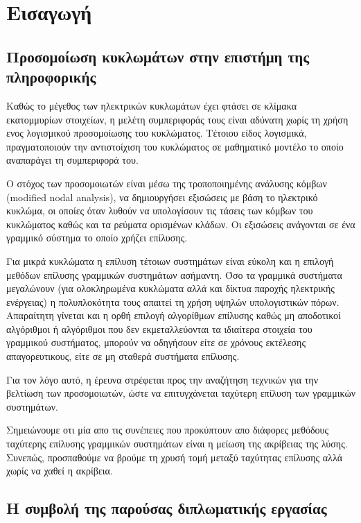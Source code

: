 \chapter{Εισαγωγή}
\label{ch:1.chapterIntroduction}

\section{Προσομοίωση κυκλωμάτων στην επιστήμη της πληροφορικής}

Καθώς το μέγεθος των ηλεκτρικών κυκλωμάτων έχει φτάσει σε κλίμακα εκατομμυρίων στοιχείων, η μελέτη συμπεριφοράς τους είναι αδύνατη χωρίς τη χρήση ενος λογισμικού προσομοίωσης του κυκλώματος. Τέτοιου είδος λογισμικά, πραγματοποιούν την αντιστοίχιση του κυκλώματος σε μαθηματικό μοντέλο το οποίο αναπαράγει τη συμπεριφορά του.

Ο στόχος των προσομοιωτών είναι μέσω της τροποποιημένης ανάλυσης κόμβων (modified nodal analysis), να δημιουργήσει εξισώσεις με βάση το ηλεκτρικό κυκλώμα, οι οποίες όταν λυθούν να υπολογίσουν τις τάσεις των κόμβων του κυκλώματος καθώς και τα ρεύματα ορισμένων κλάδων. Οι εξισώσεις ανάγονται σε ένα γραμμικό σύστημα το οποίο χρήζει επίλυσης. 

Για μικρά κυκλώματα η επίλυση τέτοιων συστημάτων είναι εύκολη και η επιλογή μεθόδων επίλυσης γραμμικών συστημάτων ασήμαντη. Όσο τα γραμμικά συστήματα μεγαλώνουν (για ολοκληρωμένα κυκλώματα αλλά και δίκτυα παροχής ηλεκτρικής ενέργειας) η πολυπλοκότητα τους απαιτεί τη χρήση υψηλών υπολογιστικών πόρων. Απαραίτητη γίνεται και η ορθή επιλογή αλγορίθμων επίλυσης καθώς μη αποδοτικοί αλγόριθμοι ή αλγόριθμοι που δεν εκμεταλλεύονται τα ιδιαίτερα στοιχεία του γραμμικού συστήματος, μπορούν να οδηγήσουν είτε σε χρόνους εκτέλεσης απαγορευτικους, είτε σε μη σταθερά συστήματα επίλυσης.

Για τον λόγο αυτό, η έρευνα στρέφεται προς την αναζήτηση τεχνικών για την βελτίωση των προσομοιωτών, ώστε να επιτυγχάνεται ταχύτερη επίλυση των γραμμικών συστημάτων.

Σημειώνουμε οτι μία απο τις συνέπειες που προκύπτουν απο διάφορες μεθόδους ταχύτερης επίλυσης γραμμικών συστημάτων είναι η μείωση της ακρίβειας της λύσης. Συνεπώς, προσπαθούμε να βρούμε τη χρυσή τομή μεταξύ ταχύτητας επίλυσης αλλά χωρίς να χαθεί η ακρίβεια.

\section{Η συμβολή της παρούσας διπλωματικής εργασίας}

